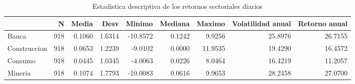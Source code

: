 \begin{table}
\caption{Estadistica descriptiva de los retornos sectoriales diarios}
\label{tab:tabla1_descriptiva}
\begin{tabular}{lrrrrrrrr}
\toprule
 & N & Media & Desv & Minimo & Mediana & Maximo & Volatilidad anual & Retorno anual \\
\midrule
Banca & 918 & 0.1060 & 1.6314 & -10.8572 & 0.1242 & 9.9256 & 25.8976 & 26.7155 \\
Construccion & 918 & 0.0653 & 1.2239 & -9.0102 & 0.0000 & 11.9535 & 19.4290 & 16.4572 \\
Consumo & 918 & 0.0445 & 1.0345 & -4.0063 & 0.0226 & 8.0464 & 16.4219 & 11.2057 \\
Mineria & 918 & 0.1074 & 1.7793 & -10.0083 & 0.0616 & 9.9653 & 28.2458 & 27.0700 \\
\bottomrule
\end{tabular}
\end{table}
